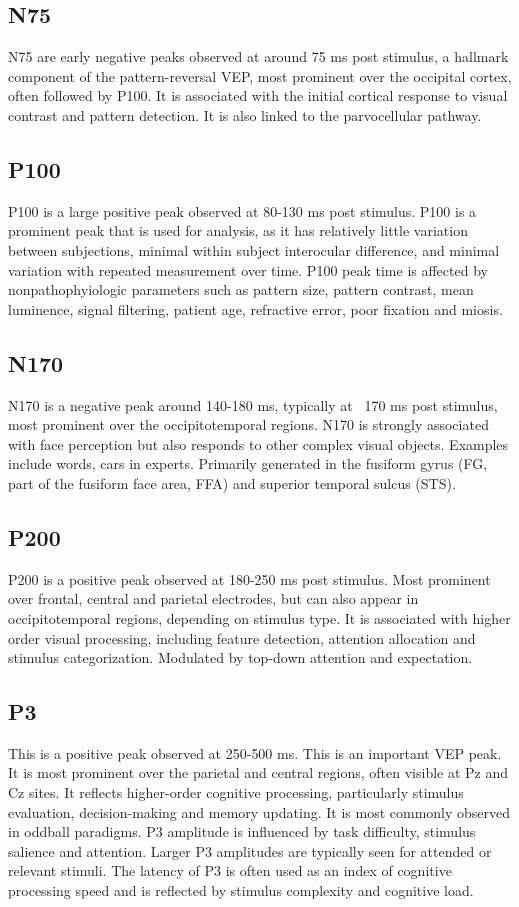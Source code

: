 \documentclass{article}
\begin{document}
	
	\subsection{N75}
	N75 are early negative peaks observed at around 75 ms post stimulus, a hallmark component of the pattern-reversal VEP, most prominent over the occipital cortex, often followed by P100. It is associated with the initial cortical response to visual contrast and pattern detection. It is also linked to the parvocellular pathway.
	
	\subsection{P100}
	P100 is a large positive peak observed at 80-130 ms post stimulus. P100 is a prominent peak that is used for analysis, as it has relatively little variation between subjections, minimal within subject interocular difference, and minimal variation with repeated measurement over time. P100 peak time is affected by nonpathophyiologic parameters such as pattern size, pattern contrast, mean luminence, signal filtering, patient age, refractive error, poor fixation and miosis.
	
	\subsection{N170}
	N170 is a negative peak around 140-180 ms, typically at ~170 ms post stimulus, most prominent over the occipitotemporal regions. N170 is strongly associated with face perception but also responds to other complex visual objects. Examples include words, cars in experts. Primarily generated in the fusiform gyrus (FG, part of the fusiform face area, FFA) and superior temporal sulcus (STS).
	
	\subsection{P200}
	P200 is a positive peak observed at 180-250 ms post stimulus. Most prominent over frontal, central and parietal electrodes, but can also appear in occipitotemporal regions, depending on stimulus type. It is associated with higher order visual processing, including feature detection, attention allocation and stimulus categorization. Modulated by top-down attention and expectation.
	
	\subsection{P3}
	This is a positive peak observed at 250-500 ms. This is an important VEP peak. It is most prominent over the parietal and central regions, often visible at Pz and Cz sites. It reflects higher-order cognitive processing, particularly stimulus evaluation, decision-making and memory updating. It is most commonly observed in oddball paradigms. P3 amplitude is influenced by task difficulty, stimulus salience and attention. Larger P3 amplitudes are typically seen for attended or relevant stimuli. The latency of P3 is often used as an index of cognitive processing speed and is reflected by stimulus complexity and cognitive load.
	
\end{document}
